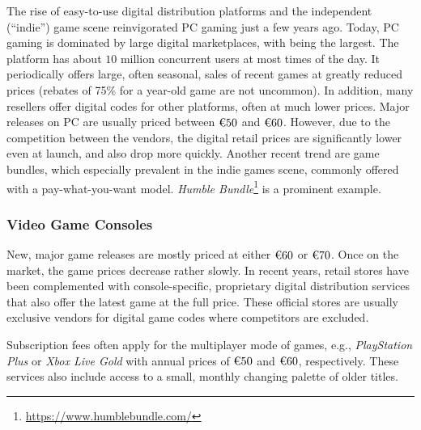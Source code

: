The rise of easy-to-use digital distribution platforms and the
independent (``indie'') game scene reinvigorated \gls{PC} gaming just a few
years ago. Today, \gls{PC} gaming is dominated by large digital marketplaces,
with \steam being the largest. The platform has about $10$ million
concurrent users at most times of the day. It periodically offers large,
often seasonal, sales of recent games at greatly reduced prices (rebates
of 75\% for a year-old game are not uncommon). In addition, many
resellers offer digital codes for other platforms, often at much lower
prices.
Major releases on PC are usually priced between $\text{\texteuro} 50$
and $\text{\texteuro} 60$. However, due to the competition between the
vendors, the digital retail prices are significantly lower even at
launch, and also drop more quickly. Another recent trend are game
bundles, which especially prevalent in the indie games scene, commonly
offered with a pay-what-you-want model. \textit{Humble
Bundle}\footnote{\url{https://www.humblebundle.com/}} is a prominent
example.






\subsubsection{Video Game Consoles}

New, major game releases are mostly priced at either
$\text{\texteuro} 60$ or $\text{\texteuro} 70$. Once on the market, the
game prices decrease rather slowly. In recent years, retail stores have
been complemented with console-specific, proprietary digital
distribution services that also offer the latest game at the full price.
These official stores are usually exclusive vendors for digital game
codes where competitors are excluded.

Subscription fees often apply for the multiplayer mode of games, e.g.,
\textit{PlayStation Plus} or \textit{Xbox Live Gold} with annual prices
of $\text{\texteuro} 50$ and $\text{\texteuro} 60$, respectively. These
services also include access to a small, monthly changing palette of
older titles.

